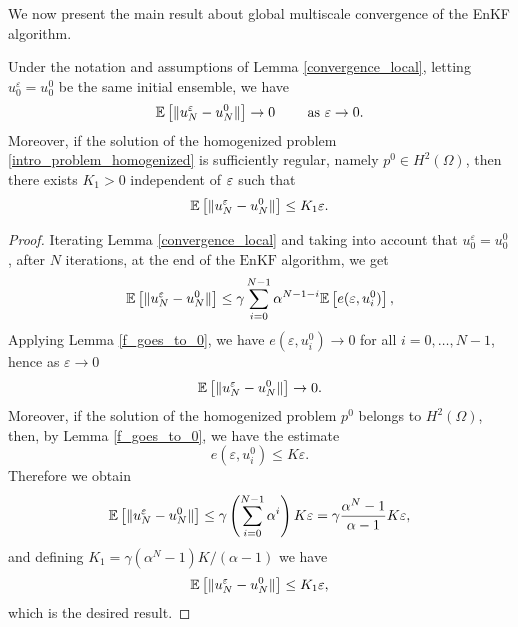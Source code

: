 We now present the main result about global multiscale convergence of the EnKF algorithm.

\begin{proposition} \label{convergence_result}
Under the notation and assumptions of Lemma \ref{convergence_local}, letting $u_0^{\varepsilon} = u_0^0$ be the same initial ensemble, we have
\[ \mathbb{E} \left [ \lVert u_N^{\varepsilon} - u_N^0\rVert \right ] \to 0 \qquad \text{ as } \varepsilon \to 0.  \]
Moreover, if the solution of the homogenized problem \eqref{intro_problem_homogenized} is sufficiently regular, namely $p^0 \in H^2(\Omega)$, then there exists $K_1 > 0$ independent of $\varepsilon$ such that
\[ \mathbb{E} \left [ \lVert u_N^{\varepsilon} - u_N^0\rVert \right ] \le K_1 \varepsilon. \]
\end{proposition}
\begin{proof}
	Iterating Lemma \ref{convergence_local} and taking into account that $u_0^{\varepsilon} = u_0^0$, after $N$ iterations, at the end of the $\mathrm{EnKF}$ algorithm, we get
	\begin{equation*}
		\mathbb{E} \left [ \lVert u_N^{\varepsilon} - u_N^0\rVert \right ] \le \gamma \sum_{i=0}^{N-1} \alpha^{N-1-i} \mathbb{E} \left [ e(\varepsilon, u^0_i) \right ],
	\end{equation*}
	Applying Lemma \ref{f_goes_to_0}, we have $e(\varepsilon, u_i^0) \to 0$ for all $i = 0, \dots, N-1$, hence as $\varepsilon \to 0$
	\begin{equation*}
		\mathbb{E} \left [ \lVert u_N^{\varepsilon} - u_N^0\rVert \right ] \to 0.
	\end{equation*}
	Moreover, if the solution of the homogenized problem $p^0$ belongs to $H^2(\Omega)$, then, by Lemma \ref{f_goes_to_0}, we have the estimate
	\[ e(\varepsilon, u_i^0) \le K \varepsilon. \]
	Therefore we obtain
	\begin{equation*}
	\mathbb{E} \left [ \lVert u_N^{\varepsilon} - u_N^0\rVert \right ] \le \gamma \left ( \sum_{i=0}^{N-1} \alpha^{i} \right ) K \varepsilon = \gamma \frac{\alpha^N - 1}{\alpha - 1} K \varepsilon,
	\end{equation*}
	and defining $K_1 = \gamma (\alpha^N - 1) K /(\alpha - 1)$ we have
	\[ \mathbb{E} \left [ \lVert u_N^{\varepsilon} - u_N^0\rVert \right ] \le K_1 \varepsilon, \]
	which is the desired result.
\end{proof}

